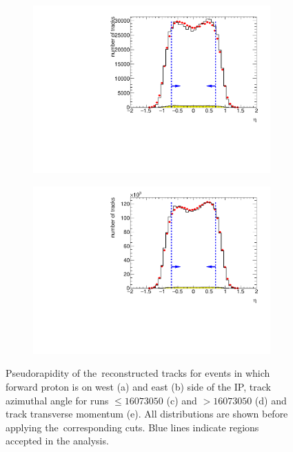 \begin{figure}[h!]
\begin{subfigure}{.45\textwidth}
		\caption{}
	\end{subfigure}
	\begin{subfigure}{.45\textwidth}
		\includegraphics[width=\textwidth, page=12]{chapters/chrgSTAR/img/selection/SDT_1.pdf}
		\caption{}
	\end{subfigure}
	\begin{subfigure}{.45\textwidth}
		\includegraphics[width=\textwidth, page=4]{chapters/chrgSTAR/img/selection/SDT.pdf}
		\caption{}
	\end{subfigure}
	\begin{minipage}{.45\textwidth}
		
		
		\caption{Pseudorapidity of the~reconstructed tracks for events in which forward proton is on  west (a) and east (b) side of the IP, track azimuthal angle for runs $\leq 16073050$ (c) and $>16073050$ (d) and track transverse momentum (e). All distributions are shown before applying  the~corresponding cuts. Blue lines indicate regions accepted in the analysis.}
		\label{fig:ptEtaPhiSTAR}
	\end{minipage}
\end{figure}


